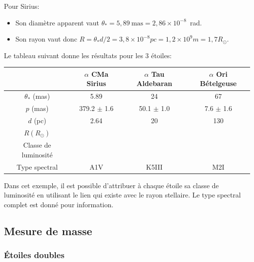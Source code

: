 \documentclass[a4paper,10pt]{report}
\renewcommand{\u}[1]{\ensuremath{\mathrm{#1}}} %
\begin{document}
\begin{Answer}
  Pour Sirius:
  \begin{itemize}
  \item Son diamètre apparent vaut $\theta_*= 5,89~\u{mas} = 2,86 \times
    10^{-8}$~rad.
  \item Son rayon vaut donc $R = \theta_* d / 2 = 3,8 \times 10^{-8}
    pc = 1,2 \times 10^9 m = 1,7R_{\odot}$.
  \end{itemize}
  Le tableau suivant donne les résultats pour les 3 étoiles:
  \begin{center}
    \begin{tabular}{|c|c|c|c|}
      \hline
      & $\alpha$ CMa Sirius & $\alpha$ Tau Aldebaran & $\alpha$ Ori
      Bételgeuse \\
      \hline
      $\theta_*$ (mas) & 5.89 & 24 & 67 \\
      \hline
      $p$ (mas) & 379.2 $\pm$ 1.6 & 50.1 $\pm$ 1.0 & 7.6 $\pm$ 1.6 \\
      \hline
      $d$ (pc) & 2.64  & 20  & 130 \\
      \hline
      $R (R_{\odot})$ & \color{red}{1.7}  & \color{red}{52}  &
      \color{red}{936} \\
      \hline
      Classe de luminosité & \color{red}{V}  & \color{red}{III}  &
      \color{red}{I} \\
      \hline
      Type spectral & A1V  & K5III  & M2I \\
      \hline
    \end{tabular}
  \end{center}
  Dans cet exemple, il est possible d'attribuer à chaque étoile sa
  classe de luminosité en utilisant le lien qui existe avec le rayon
  stellaire. Le type spectral complet est donné pour information.
\end{Answer}

\subsection{Mesure de masse}

\subsubsection{Étoiles doubles}
\end{document}
